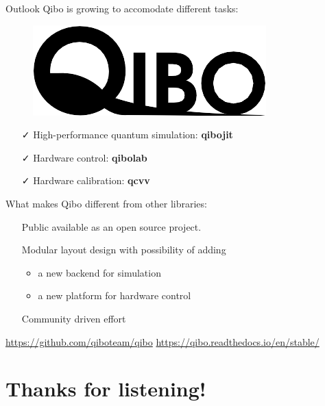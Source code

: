 \documentclass[11p,aspectratio=169]{beamer}
\begin{document}
\begin{frame}{Outlook}
    Qibo is growing to accomodate different tasks:
    \begin{figure}
        \includegraphics[width=0.9\linewidth]{figures/qibo_logo.png} 
        \end{figure}
    \begin{itemize}
        \item[ \color{teal} \faCheck] High-performance quantum simulation: {\color{blue} \textbf{qibojit}}
        \item[ \color{orange}\faCheck] Hardware control: {\color{red} \textbf{qibolab}}
        \item[ \color{orange} \faCheck] Hardware calibration: { \color{teal} \textbf{qcvv} }
    \end{itemize}

    What makes Qibo different from other libraries:
    \begin{itemize}
        \item[ \faPlus] Public available as an open source project.
        \item[ \faPlus] Modular layout design with possibility of adding
        \begin{itemize}
            \item a new backend for simulation
            \item a new platform for hardware control
        \end{itemize}
        \item[ \faPlus] Community driven effort
    \end{itemize}

    \url{https://github.com/qiboteam/qibo} \hfill \url{https://qibo.readthedocs.io/en/stable/}
\end{frame}
\section{Thanks for listening!}
\end{document}
